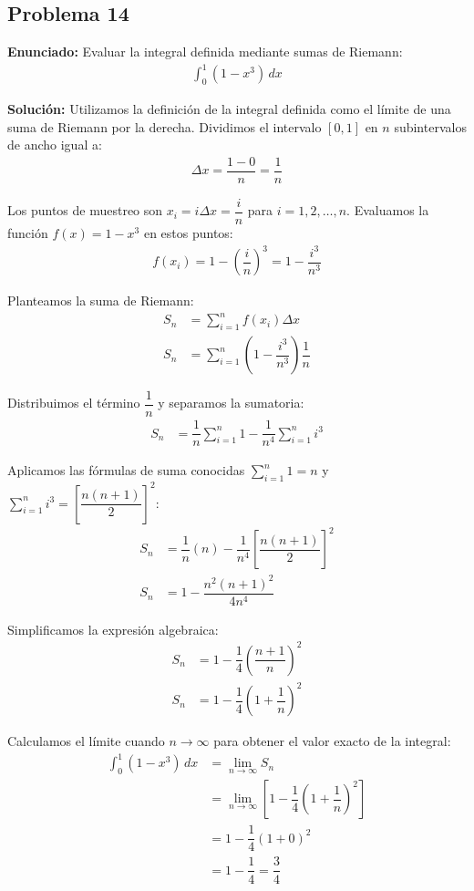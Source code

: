 \subsection*{Problema 14}
\textbf{Enunciado:} Evaluar la integral definida 
mediante sumas de Riemann:
\begin{align*}
\int_{0}^{1} (1 - x^3) \, dx
\end{align*}

\textbf{Solución:} 
Utilizamos la definición de la integral definida 
como el límite de una suma de Riemann por la 
derecha. Dividimos el intervalo $[0, 1]$ en $n$ 
subintervalos de ancho igual a:
\begin{align*}
\Delta x = \dfrac{1 - 0}{n} = \dfrac{1}{n}
\end{align*}

Los puntos de muestreo son $x_i = i \Delta x = \dfrac{i}{n}$ 
para $i = 1, 2, \dots, n$. Evaluamos la función 
$f(x) = 1 - x^3$ en estos puntos:
\begin{align*}
f(x_i) = 1 - \left(\dfrac{i}{n}\right)^3 = 1 - \dfrac{i^3}{n^3}
\end{align*}

Planteamos la suma de Riemann:
\begin{align*}
S_n &= \sum_{i=1}^{n} f(x_i) \Delta x \\
S_n &= \sum_{i=1}^{n} \left(1 - \dfrac{i^3}{n^3}\right) \dfrac{1}{n}
\end{align*}

Distribuimos el término $\dfrac{1}{n}$ y 
separamos la sumatoria:
\begin{align*}
S_n &= \dfrac{1}{n} \sum_{i=1}^{n} 1 
- \dfrac{1}{n^4} \sum_{i=1}^{n} i^3
\end{align*}

Aplicamos las fórmulas de suma conocidas 
$\sum_{i=1}^{n} 1 = n$ y 
$\sum_{i=1}^{n} i^3 = \left[\dfrac{n(n+1)}{2}\right]^2$:
\begin{align*}
S_n &= \dfrac{1}{n} (n) 
- \dfrac{1}{n^4} \left[\dfrac{n(n+1)}{2}\right]^2 \\
S_n &= 1 - \dfrac{n^2(n+1)^2}{4n^4}
\end{align*}

Simplificamos la expresión algebraica:
\begin{align*}
S_n &= 1 - \dfrac{1}{4} \left(\dfrac{n+1}{n}\right)^2 \\
S_n &= 1 - \dfrac{1}{4} \left(1 + \dfrac{1}{n}\right)^2
\end{align*}

Calculamos el límite cuando $n \to \infty$ 
para obtener el valor exacto de la integral:
\begin{align*}
\int_{0}^{1} (1 - x^3) \, dx &= \lim_{n \to \infty} S_n \\
&= \lim_{n \to \infty} \left[ 1 - \dfrac{1}{4} \left(1 + \dfrac{1}{n}\right)^2 \right] \\
&= 1 - \dfrac{1}{4} (1 + 0)^2 \\
&= 1 - \dfrac{1}{4} = \dfrac{3}{4}
\end{align*}

